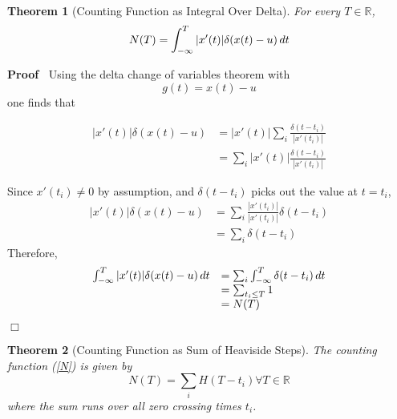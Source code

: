 \documentclass{article}
\newenvironment{proof}{\noindent\textbf{Proof\ }}{\hspace*{\fill}$\Box$\medskip}
\newtheorem{theorem}{Theorem}
\begin{document}
\begin{theorem}
  [Counting Function as Integral Over Delta] For every $T \in \mathbb{R}$,
  \begin{equation}
    N (T) = \int_{- \infty}^T |x' (t) | \delta (x (t) - u)  \hspace{0.17em} dt
  \end{equation}
\end{theorem}

\begin{proof}
  Using the delta change of variables theorem with
  \begin{equation}
    g (t) = x (t) - u
  \end{equation}
  one finds that
  
  \begin{align}
    |x' (t) | \delta (x (t) - u) & = |x' (t) |  \sum_i \frac{\delta (t -
    t_i)}{|x' (t_i) |} \\
    & = \sum_i |x' (t) | \frac{\delta (t - t_i)}{|x' (t_i) |} 
  \end{align}
  
  Since $x' (t_i) \neq 0$ by assumption, and $\delta (t - t_i)$ picks out the
  value at $t = t_i$,
  \begin{equation}
    \begin{array}{ll}
      |x' (t) | \delta (x (t) - u) & = \sum_i \frac{|x' (t_i) |}{|x' (t_i) |}
      \delta (t - t_i)\\
      & = \sum_i \delta (t - t_i)
    \end{array}
  \end{equation}
  Therefore,
  \begin{equation}
    \begin{array}{ll}
      \int_{- \infty}^T |x' (t) | \delta (x (t) - u)  \hspace{0.17em} dt & =
      \sum_i \int_{- \infty}^T \delta (t - t_i)  \hspace{0.17em} dt\\
      & = \sum_{t_i \leq T} 1\\
      & = N (T)
    \end{array}
  \end{equation}
  
\end{proof}

\begin{theorem}
  [Counting Function as Sum of Heaviside Steps] The counting function
  (\ref{N}) is given by
  \begin{equation}
    N (T) = \sum_i H (T - t_i) \forall T \in \mathbb{R}
  \end{equation}
  where the sum runs over all zero crossing times $t_i$.
\end{theorem}
\end{document}
